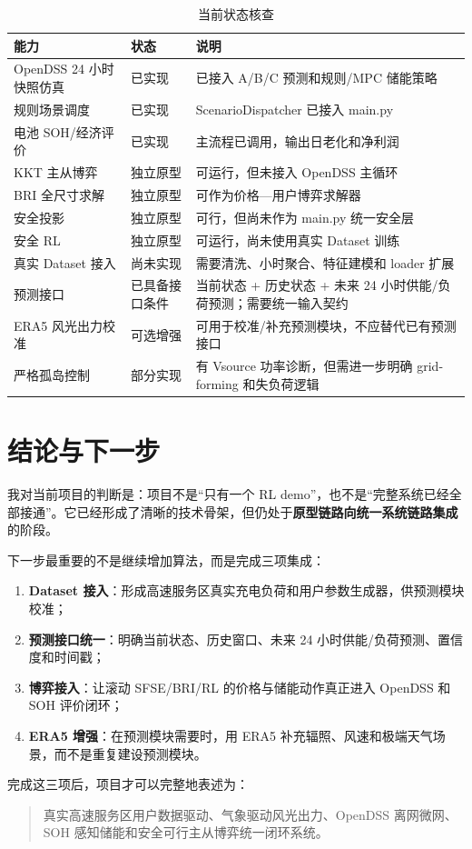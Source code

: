 \documentclass[UTF8,a4paper,11pt]{ctexart}
\begin{document}
\begin{table}[htbp]
\centering
\small
\caption{当前状态核查}
\begin{tabular}{p{4.2cm} p{3.0cm} p{7.0cm}}
\toprule
\textbf{能力} & \textbf{状态} & \textbf{说明}\\
\midrule
OpenDSS 24 小时快照仿真 & 已实现 & 已接入 A/B/C 预测和规则/MPC 储能策略\\
规则场景调度 & 已实现 & ScenarioDispatcher 已接入 main.py\\
电池 SOH/经济评价 & 已实现 & 主流程已调用，输出日老化和净利润\\
KKT 主从博弈 & 独立原型 & 可运行，但未接入 OpenDSS 主循环\\
BRI 全尺寸求解 & 独立原型 & 可作为价格—用户博弈求解器\\
安全投影 & 独立原型 & 可行，但尚未作为 main.py 统一安全层\\
安全 RL & 独立原型 & 可运行，尚未使用真实 Dataset 训练\\
真实 Dataset 接入 & 尚未实现 & 需要清洗、小时聚合、特征建模和 loader 扩展\\
预测接口 & 已具备接口条件 & 当前状态 + 历史状态 + 未来 24 小时供能/负荷预测；需要统一输入契约\\
ERA5 风光出力校准 & 可选增强 & 可用于校准/补充预测模块，不应替代已有预测接口\\
严格孤岛控制 & 部分实现 & 有 Vsource 功率诊断，但需进一步明确 grid-forming 和失负荷逻辑\\
\bottomrule
\end{tabular}
\end{table}

\section{结论与下一步}

我对当前项目的判断是：项目不是“只有一个 RL demo”，也不是“完整系统已经全部接通”。它已经形成了清晰的技术骨架，但仍处于\textbf{原型链路向统一系统链路集成}的阶段。

下一步最重要的不是继续增加算法，而是完成三项集成：

\begin{enumerate}
  \item \textbf{Dataset 接入}：形成高速服务区真实充电负荷和用户参数生成器，供预测模块校准；
  \item \textbf{预测接口统一}：明确当前状态、历史窗口、未来 24 小时供能/负荷预测、置信度和时间戳；
  \item \textbf{博弈接入}：让滚动 SFSE/BRI/RL 的价格与储能动作真正进入 OpenDSS 和 SOH 评价闭环；
  \item \textbf{ERA5 增强}：在预测模块需要时，用 ERA5 补充辐照、风速和极端天气场景，而不是重复建设预测模块。
\end{enumerate}

完成这三项后，项目才可以完整地表述为：

\begin{quote}
真实高速服务区用户数据驱动、气象驱动风光出力、OpenDSS 离网微网、SOH 感知储能和安全可行主从博弈统一闭环系统。
\end{quote}
\end{document}
